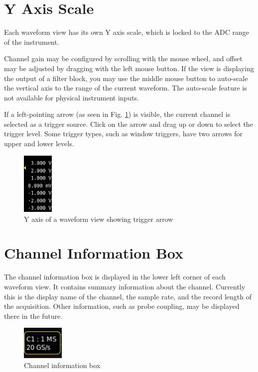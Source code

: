 \section{Y Axis Scale}

Each waveform view has its own Y axis scale, which is locked to the ADC range of the instrument.

Channel gain may be configured by scrolling with the mouse wheel, and offset may be adjusted by dragging with the left
mouse button. If the view is displaying the output of a filter block, you may use the middle mouse button to auto-scale
the vertical axis to the range of the current waveform. The auto-scale feature is not available for physical instrument
inputs.

If a left-pointing arrow (as seen in Fig. \ref{y-axis}) is visible, the current channel is selected as a trigger
source. Click on the arrow and drag up or down to select the trigger level. Some trigger types, such as window triggers,
have two arrows for upper and lower levels.

\begin{figure}[H]
\centering
\includegraphics[height=3cm]{images/y-axis.png}
\caption{Y axis of a waveform view showing trigger arrow}
\label{y-axis}
\end{figure}

\section{Channel Information Box}

The channel information box is displayed in the lower left corner of each waveform view. It contains summary
information about the channel. Currently this is the display name of the channel, the sample rate, and the record
length of the acquisition. Other information, such as probe coupling, may be displayed there in the future.

\begin{figure}[H]
\centering
\includegraphics[width=2cm]{images/channel-infobox.png}
\caption{Channel information box}
\label{channel-infobox}
\end{figure}

